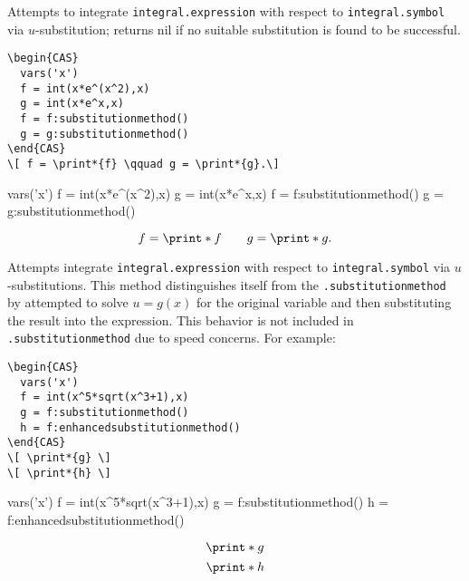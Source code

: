
Attempts to integrate \texttt{integral.expression} with respect to \texttt{integral.symbol} via $u$-substitution; returns nil if no suitable substitution is found to be successful. 

\begin{codebox}
    \begin{verbatim}
\begin{CAS}
  vars('x')
  f = int(x*e^(x^2),x)
  g = int(x*e^x,x)
  f = f:substitutionmethod()
  g = g:substitutionmethod()
\end{CAS}
\[ f = \print*{f} \qquad g = \print*{g}.\] 
\end{verbatim}
\tcblower
\begin{CAS}
  vars('x')
  f = int(x*e^(x^2),x)
  g = int(x*e^x,x)
  f = f:substitutionmethod()
  g = g:substitutionmethod()
\end{CAS}
\[ f = \print*{f} \qquad g = \print*{g}.\] 
\end{codebox}


Attempts integrate \texttt{integral.expression} with respect to \texttt{integral.symbol} via $u$-substitutions. This method distinguishes itself from the \texttt{.substitutionmethod} by attempted to solve $u= g(x)$ for the original variable and then substituting the result into the expression. This behavior is not included in \texttt{.substitutionmethod} due to speed concerns. For example:

\begin{codebox}
    \begin{verbatim}
\begin{CAS}
  vars('x')
  f = int(x^5*sqrt(x^3+1),x)
  g = f:substitutionmethod()
  h = f:enhancedsubstitutionmethod()
\end{CAS}
\[ \print*{g} \] 
\[ \print*{h} \] 
\end{verbatim}
\tcblower
\begin{CAS}
    vars('x')
    f = int(x^5*sqrt(x^3+1),x)
    g = f:substitutionmethod()
    h = f:enhancedsubstitutionmethod()
\end{CAS}
\[ \print*{g} \] 
\[ \print*{h} \] 
\end{codebox}


